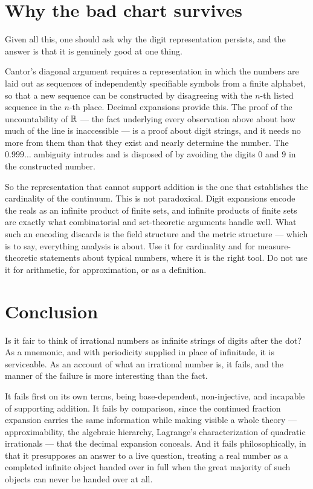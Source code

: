 \documentclass{essay}
\begin{document}
\section{Why the bad chart survives}

Given all this, one should ask why the digit representation persists, and the
answer is that it is genuinely good at one thing.

Cantor's diagonal argument requires a representation in which the numbers are
laid out as sequences of independently specifiable symbols from a finite
alphabet, so that a new sequence can be constructed by disagreeing with the
\(n\)-th listed sequence in the \(n\)-th place. Decimal expansions provide this. The
proof of the uncountability of \(\mathbb{R}\) --- the fact underlying every observation
above about how much of the line is inaccessible --- is a proof about digit
strings, and it needs no more from them than that they exist and nearly
determine the number. The \(0.999\ldots\) ambiguity intrudes and is disposed of by
avoiding the digits \(0\) and \(9\) in the constructed number.

So the representation that cannot support addition is the one that establishes
the cardinality of the continuum. This is not paradoxical. Digit expansions
encode the reals as an infinite product of finite sets, and infinite products of
finite sets are exactly what combinatorial and set-theoretic arguments handle
well. What such an encoding discards is the field structure and the metric
structure --- which is to say, everything analysis is about. Use it for
cardinality and for measure-theoretic statements about typical numbers, where it
is the right tool. Do not use it for arithmetic, for approximation, or as a
definition.

\section{Conclusion}

Is it fair to think of irrational numbers as infinite strings of digits after
the dot? As a mnemonic, and with periodicity supplied in place of infinitude, it
is serviceable. As an account of what an irrational number is, it fails, and the
manner of the failure is more interesting than the fact.

It fails first on its own terms, being base-dependent, non-injective, and
incapable of supporting addition. It fails by comparison, since the continued
fraction expansion carries the same information while making visible a whole
theory --- approximability, the algebraic hierarchy, Lagrange's characterization
of quadratic irrationals --- that the decimal expansion conceals. And it fails
philosophically, in that it presupposes an answer to a live question, treating a
real number as a completed infinite object handed over in full when the great
majority of such objects can never be handed over at all.
\end{document}
